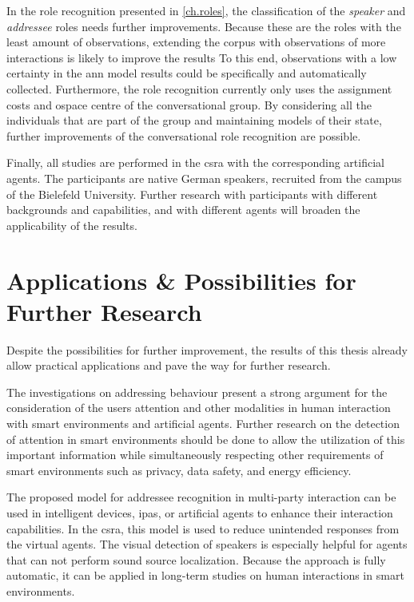 In the role recognition presented in \cref{ch.roles}, the classification of the \emph{\gls{speaker}} and \emph{\gls{addressee}} roles needs further improvements.
Because these are the roles with the least amount of observations, extending the corpus with observations of more interactions is likely to improve the results 
To this end, observations with a low certainty in the \gls{ann} model results could be specifically and automatically collected.
Furthermore, the role recognition currently only uses the assignment costs and \gls{ospace} centre of the \gls{conversational group}.
By considering all the individuals that are part of the group and maintaining models of their state, further improvements of the \gls{conversational role} recognition are possible.

Finally, all studies are performed in the \gls{csra} with the corresponding \glspl{artificial agent}.
The participants are native German speakers, recruited from the campus of the Bielefeld University.
Further research with participants with different backgrounds and capabilities, and with different agents will broaden the applicability of the results.

\section{Applications \& Possibilities for Further Research}

Despite the possibilities for further improvement, the results of this thesis already allow practical applications and pave the way for further research.

The investigations on addressing behaviour present a strong argument for the consideration of the users attention and other modalities in human interaction with \glspl{smart environment} and \glspl{artificial agent}.
Further research on the detection of attention in \glspl{smart environment} should be done to allow the utilization of this important information while simultaneously respecting other requirements of \glspl{smart environment} such as privacy, data safety, and energy efficiency.

The proposed model for \gls{addressee} recognition in multi-party interaction can be used in intelligent \glspl{device}, \glspl{ipa}, or \glspl{artificial agent} to enhance their interaction capabilities. 
In the \gls{csra}, this model is used to reduce unintended responses from the \glspl{virtual agent}.
The visual detection of \glspl{speaker} is especially helpful for agents that can not perform sound source localization. 
Because the approach is fully automatic, it can be applied in long-term studies on human interactions in \glspl{smart environment}. 

